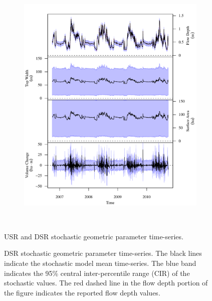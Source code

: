 \begin{linenumbers}
\subfiguremid
\begin{landscape}
	\begin{figure}
		\begin{subfigure}{0.7\textwidth}
			\centering
			\includegraphics[width=\textwidth]{"Figures/Results_USR/Stochastic/G TS E"}
			\label{sub:GeoTS_E}	
		\end{subfigure}\\
		\caption{USR and DSR stochastic geometric parameter time-series.}
	\end{figure}
\end{landscape}

\subfiguretop
\begin{landscape}
	\begin{figure}
		\caption[DSR stochastic geometric parameter time-series.]{DSR stochastic geometric parameter time-series. The black lines indicate the stochastic model mean time-series.  The blue band indicates the 95\% central inter-percentile range (CIR) of the stochastic values.  The red dashed line in the flow depth portion of the figure indicates the reported flow depth values.}
		\label{fig:GeoTS_DS}
	\end{figure}
\end{landscape}


\end{linenumbers}
